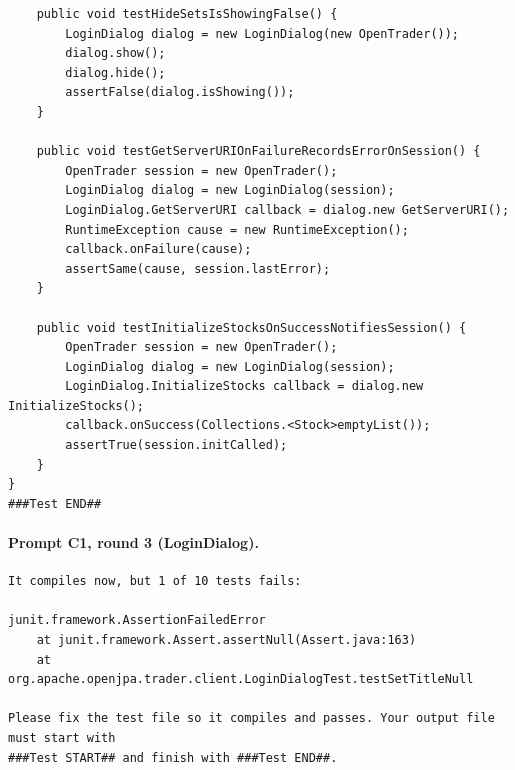 \begin{lstlisting}
    public void testHideSetsIsShowingFalse() {
        LoginDialog dialog = new LoginDialog(new OpenTrader());
        dialog.show();
        dialog.hide();
        assertFalse(dialog.isShowing());
    }

    public void testGetServerURIOnFailureRecordsErrorOnSession() {
        OpenTrader session = new OpenTrader();
        LoginDialog dialog = new LoginDialog(session);
        LoginDialog.GetServerURI callback = dialog.new GetServerURI();
        RuntimeException cause = new RuntimeException();
        callback.onFailure(cause);
        assertSame(cause, session.lastError);
    }

    public void testInitializeStocksOnSuccessNotifiesSession() {
        OpenTrader session = new OpenTrader();
        LoginDialog dialog = new LoginDialog(session);
        LoginDialog.InitializeStocks callback = dialog.new InitializeStocks();
        callback.onSuccess(Collections.<Stock>emptyList());
        assertTrue(session.initCalled);
    }
}
###Test END##
\end{lstlisting}

\paragraph*{Prompt C1, round 3 (LoginDialog).}
\label{prompt:ld-c1-r3}
\begin{lstlisting}
It compiles now, but 1 of 10 tests fails:

junit.framework.AssertionFailedError
	at junit.framework.Assert.assertNull(Assert.java:163)
	at org.apache.openjpa.trader.client.LoginDialogTest.testSetTitleNull

Please fix the test file so it compiles and passes. Your output file must start with
###Test START## and finish with ###Test END##.
\end{lstlisting}

